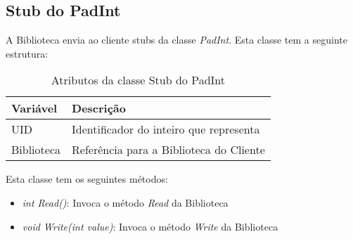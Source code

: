 \subsection{Stub do PadInt}

A Biblioteca envia ao cliente stubs da classe \textit{PadInt}. Esta classe tem a seguinte estrutura:

\begin{table}[H]
\centering
\begin{tabular}{| p{2cm} | p{} |}
\hline
\textbf{Variável} & \textbf{Descrição} \\
\hline
UID & Identificador do inteiro que representa \\
\hline
Biblioteca & Referência para a Biblioteca do Cliente \\
\hline
\end{tabular}
\caption{Atributos da classe Stub do PadInt}
\end{table}

Esta classe tem os seguintes métodos:

\begin{itemize}
	\item \textit{int Read()}: Invoca o método \textit{Read} da Biblioteca
	\item \textit{void Write(int value)}: Invoca o método \textit{Write} da Biblioteca
\end{itemize}